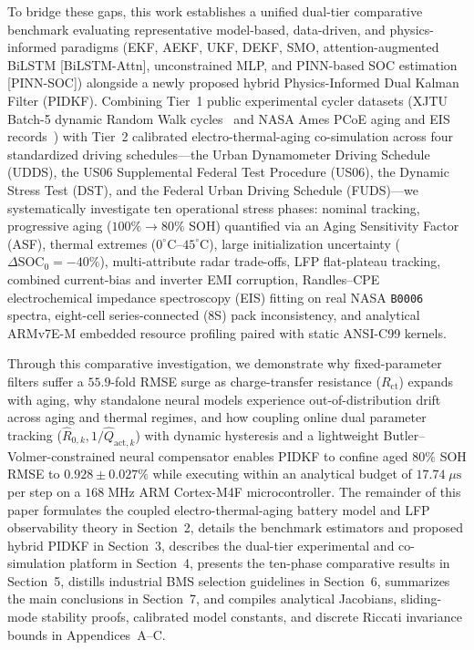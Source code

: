 \documentclass[11pt,a4paper]{article}
\providecommand{\upmu}{\mu}
\begin{document}
To bridge these gaps, this work establishes a unified dual-tier comparative benchmark evaluating representative model-based, data-driven, and physics-informed paradigms (EKF, AEKF, UKF, DEKF, SMO, attention-augmented BiLSTM [BiLSTM-Attn], unconstrained MLP, and PINN-based SOC estimation [PINN-SOC]) alongside a newly proposed hybrid Physics-Informed Dual Kalman Filter (PIDKF). Combining Tier~1 public experimental cycler datasets (XJTU Batch-5 dynamic Random Walk cycles~\cite{Wang2024xjtu} and NASA Ames PCoE aging and EIS records~\cite{Saha2007nasa}) with Tier~2 calibrated electro-thermal-aging co-simulation across four standardized driving schedules---the Urban Dynamometer Driving Schedule (UDDS), the US06 Supplemental Federal Test Procedure (US06), the Dynamic Stress Test (DST), and the Federal Urban Driving Schedule (FUDS)---we systematically investigate ten operational stress phases: nominal tracking, progressive aging ($100\%\rightarrow 80\%$ SOH) quantified via an Aging Sensitivity Factor (ASF), thermal extremes ($0^\circ\text{C}\text{--}45^\circ\text{C}$), large initialization uncertainty ($\Delta\text{SOC}_0 = -40\%$), multi-attribute radar trade-offs, LFP flat-plateau tracking, combined current-bias and inverter EMI corruption, Randles--CPE electrochemical impedance spectroscopy (EIS) fitting on real NASA \texttt{B0006} spectra, eight-cell series-connected (8S) pack inconsistency, and analytical ARMv7E-M embedded resource profiling paired with static ANSI-C99 kernels.

Through this comparative investigation, we demonstrate why fixed-parameter filters suffer a $55.9$-fold RMSE surge as charge-transfer resistance ($R_{\text{ct}}$) expands with aging, why standalone neural models experience out-of-distribution drift across aging and thermal regimes, and how coupling online dual parameter tracking ($\hat{R}_{0,k}, 1/\hat{Q}_{\text{act},k}$) with dynamic hysteresis and a lightweight Butler--Volmer-constrained neural compensator enables PIDKF to confine aged $80\%$ SOH RMSE to $0.928\pm0.027\%$ while executing within an analytical budget of $17.74\;\upmu\mathrm{s}$ per step on a $168\;\mathrm{MHz}$ ARM Cortex-M4F microcontroller. The remainder of this paper formulates the coupled electro-thermal-aging battery model and LFP observability theory in Section~2, details the benchmark estimators and proposed hybrid PIDKF in Section~3, describes the dual-tier experimental and co-simulation platform in Section~4, presents the ten-phase comparative results in Section~5, distills industrial BMS selection guidelines in Section~6, summarizes the main conclusions in Section~7, and compiles analytical Jacobians, sliding-mode stability proofs, calibrated model constants, and discrete Riccati invariance bounds in Appendices~A--C.
\end{document}
